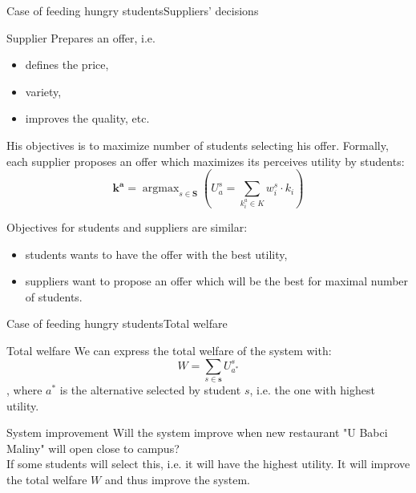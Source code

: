 \documentclass{beamer}
\newcommand\male{\fontsize{8}{7.2}\selectfont}
\DeclareMathOperator*{\argmax}{argmax}
\begin{document}
\begin{frame}{Case of feeding hungry students}{Suppliers' decisions}
\male
\begin{block}{Supplier}
Prepares an offer, i.e. \begin{itemize}
\item defines the price, \item variety, \item improves the quality, etc. 
\end{itemize} His objectives is to maximize number of students selecting his offer.
Formally, each supplier proposes an offer which maximizes its perceives utility by students:
\begin{equation*}
\bm{k^a} = \argmax_{s \in \bm{S}} \left( U_a^s  = \sum_{k^a_i \in K} w_i^s \cdot k_i \right)
\end{equation*}
\end{block}
Objectives for students and suppliers are similar:
\begin{itemize}
 \item  students wants to have the offer with the best utility, \item suppliers want to propose an offer which will be the best for maximal number of students. 
 \end{itemize}
\end{frame}

\begin{frame}{Case of feeding hungry students}{Total welfare}
\begin{block}{Total welfare} We can express the total welfare of the system with:
\begin{equation*}
W=\sum_{s \in \bm{s}} {U_{a^{\ast}}^s}
\end{equation*}
, where $a^{\ast}$ is the alternative selected by student $s$, i.e. the one with highest utility.
\end{block}
\begin{block}{System improvement}
Will the system improve when new restaurant \alert{"U Babci Maliny"} will open close to campus?
\\ If some students will select this, i.e. it will have the highest utility. It will improve the total welfare $W$ and thus improve the system.
\end{block}
\end{frame}
\end{document}
